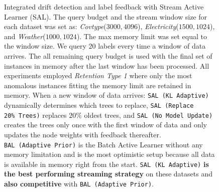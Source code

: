 \documentclass{article} %
\begin{document}
\begin{figure}
	\caption{Integrated drift detection and label feedback with Stream Active Learner (SAL). The query budget and the stream window size for each dataset was set as: \textit{Covtype}($3000, 4096$), \textit{Electricity}($1500, 1024$), and \textit{Weather}($1000, 1024$). The max memory limit was set equal to the window size. We query $20$ labels every time a window of data arrives. The all remaining query budget is used with the final set of instances in memory after the last window has been processed. All experiments employed \textit{Retention Type 1} where only the most anomalous instances fitting the memory limit are retained in memory. When a new window of data arrives: \texttt{SAL~(KL~Adaptive)} dynamically determines which trees to replace, \texttt{SAL~(Replace 20\%~Trees)} replaces $20\%$ oldest trees, and \texttt{SAL~(No~Model~Update)} creates the trees only once with the first window of data and only updates the node weights with feedback thereafter. \texttt{BAL~(Adaptive~Prior)} is the Batch Active Learner without any memory limitation and is the most optimistic setup because all data is available in memory right from the start. \texttt{SAL~(KL~Adaptive)} \textbf{is the best performing streaming strategy} on these datasets and \textbf{also competitive} with \texttt{BAL~(Adaptive~Prior)}.} \label{fig:concept_drift_num}
\end{figure}

\end{document}
